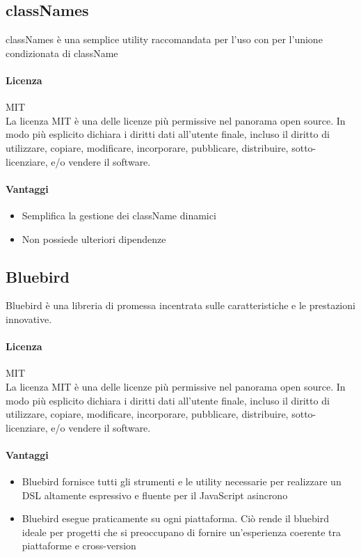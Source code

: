 \subsection{classNames}

classNames è una semplice utility raccomandata per l'uso con  per l'unione condizionata di className

\paragraph{Licenza} MIT \\
La licenza MIT è una delle licenze più permissive nel panorama open
source. In modo più esplicito dichiara i diritti dati all'utente
finale, incluso il diritto di utilizzare, copiare, modificare,
incorporare, pubblicare, distribuire, sotto-licenziare, e/o vendere il
software. 
\\

\paragraph{Vantaggi}
\begin{itemize}
	\item Semplifica la gestione dei className dinamici 
	\item Non possiede ulteriori dipendenze 
\end{itemize}


\subsection{Bluebird}
Bluebird è una libreria di promessa incentrata sulle caratteristiche e le prestazioni innovative.

\paragraph{Licenza} MIT \\
La licenza MIT è una delle licenze più permissive nel panorama open
source. In modo più esplicito dichiara i diritti dati all'utente
finale, incluso il diritto di utilizzare, copiare, modificare,
incorporare, pubblicare, distribuire, sotto-licenziare, e/o vendere il
software. 
\\

\paragraph{Vantaggi}
\begin{itemize}
\item Bluebird fornisce tutti gli strumenti e le utility necessarie per realizzare un DSL altamente espressivo e fluente per il JavaScript asincrono
\item Bluebird esegue praticamente su ogni piattaforma. Ciò rende il bluebird ideale per progetti che si preoccupano di fornire un'esperienza coerente tra piattaforme e cross-version
\end{itemize}


